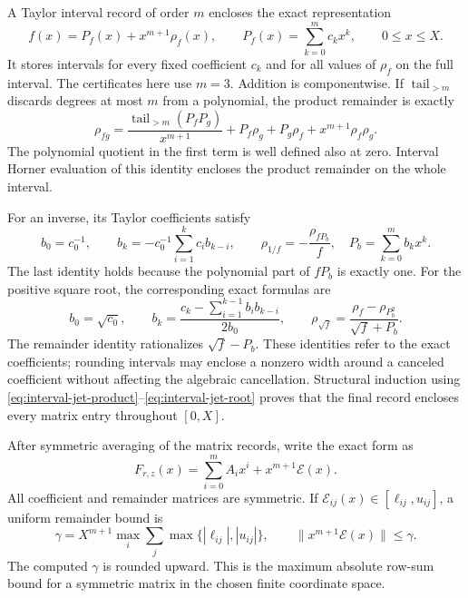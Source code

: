 \documentclass[11pt]{article}
\begin{document}
A Taylor interval record of order $m$ encloses the exact representation
\begin{equation}\label{eq:interval-jet-definition}
 f(x)=P_f(x)+x^{m+1}\rho_f(x),\qquad
 P_f(x)=\sum_{k=0}^m c_kx^k,\qquad 0\le x\le X.
\end{equation}
It stores intervals for every fixed coefficient $c_k$ and for all values
of $\rho_f$ on the full interval. The certificates here use $m=3$.
Addition is componentwise. If $\operatorname{tail}_{>m}$ discards
degrees at most $m$ from a polynomial, the product remainder is exactly
\begin{equation}\label{eq:interval-jet-product}
 \rho_{fg}=
 \frac{\operatorname{tail}_{>m}(P_fP_g)}{x^{m+1}}
 +P_f\rho_g+P_g\rho_f+x^{m+1}\rho_f\rho_g.
\end{equation}
The polynomial quotient in the first term is well defined also at zero.
Interval Horner evaluation of this identity encloses the product
remainder on the whole interval.

For an inverse, its Taylor coefficients satisfy
\begin{equation}\label{eq:interval-jet-inverse}
 b_0=c_0^{-1},\qquad
 b_k=-c_0^{-1}\sum_{i=1}^kc_i b_{k-i},\qquad
 \rho_{1/f}=-\frac{\rho_{fP_b}}{f},\quad
 P_b=\sum_{k=0}^mb_kx^k.
\end{equation}
The last identity holds because the polynomial part of $fP_b$ is exactly
one. For the positive square root, the corresponding exact formulas are
\begin{equation}\label{eq:interval-jet-root}
 b_0=\sqrt{c_0},\qquad
 b_k=\frac{c_k-\sum_{i=1}^{k-1}b_ib_{k-i}}{2b_0},\qquad
 \rho_{\sqrt f}=\frac{\rho_f-\rho_{P_b^2}}{\sqrt f+P_b}.
\end{equation}
The remainder identity rationalizes $\sqrt f-P_b$. These identities refer
to the exact coefficients; rounding intervals may enclose a nonzero
width around a canceled coefficient without affecting the algebraic
cancellation. Structural induction using
\eqref{eq:interval-jet-product}--\eqref{eq:interval-jet-root} proves that
the final record encloses every matrix entry throughout $[0,X]$.

After symmetric averaging of the matrix records, write the exact form as
\begin{equation}
 F_{r,z}(x)=\sum_{i=0}^m A_ix^i+x^{m+1}\mathcal E(x).
\end{equation}
All coefficient and remainder matrices are symmetric. If
$\mathcal E_{ij}(x)\in[\ell_{ij},u_{ij}]$, a uniform remainder
bound is
\begin{equation}\label{eq:interval-remainder-norm}
 \gamma=X^{m+1}\max_i\sum_j
              \max\{|\ell_{ij}|,|u_{ij}|\},\qquad
 \|x^{m+1}\mathcal E(x)\|\le\gamma.
\end{equation}
The computed $\gamma$ is rounded upward. This is the maximum absolute
row-sum bound for a symmetric matrix in the chosen finite coordinate
space.
\end{document}
